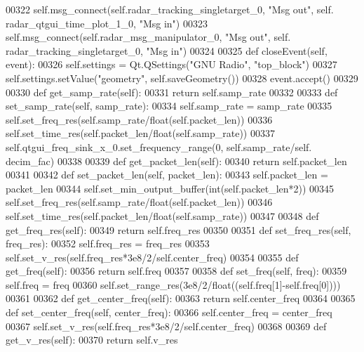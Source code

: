 \begin{DoxyCode}
00322         self.msg\_connect(self.radar_tracking_singletarget_0, \textcolor{stringliteral}{"Msg out"}, self.
      radar_qtgui_time_plot_1_0, \textcolor{stringliteral}{"Msg in"})
00323         self.msg\_connect(self.radar_msg_manipulator_0, \textcolor{stringliteral}{"Msg out"}, self.
      radar_tracking_singletarget_0, \textcolor{stringliteral}{"Msg in"})
00324 
00325     \textcolor{keyword}{def }closeEvent(self, event):
00326         self.settings = Qt.QSettings(\textcolor{stringliteral}{"GNU Radio"}, \textcolor{stringliteral}{"top\_block"})
00327         self.settings.setValue(\textcolor{stringliteral}{"geometry"}, self.saveGeometry())
00328         event.accept()
00329 
00330     \textcolor{keyword}{def }get_samp_rate(self):
00331         \textcolor{keywordflow}{return} self.samp_rate
00332 
00333     \textcolor{keyword}{def }set_samp_rate(self, samp\_rate):
00334         self.samp_rate = samp\_rate
00335         self.set_freq_res(self.samp_rate/float(self.packet_len))
00336         self.set_time_res(self.packet_len/float(self.samp_rate))
00337         self.qtgui\_freq\_sink\_x\_0.set\_frequency\_range(0, self.samp_rate/self.
      decim_fac)
00338 
00339     \textcolor{keyword}{def }get_packet_len(self):
00340         \textcolor{keywordflow}{return} self.packet_len
00341 
00342     \textcolor{keyword}{def }set_packet_len(self, packet\_len):
00343         self.packet_len = packet\_len
00344         self.set_min_output_buffer(int(self.packet_len*2))
00345         self.set_freq_res(self.samp_rate/float(self.packet_len))
00346         self.set_time_res(self.packet_len/float(self.samp_rate))
00347 
00348     \textcolor{keyword}{def }get_freq_res(self):
00349         \textcolor{keywordflow}{return} self.freq_res
00350 
00351     \textcolor{keyword}{def }set_freq_res(self, freq\_res):
00352         self.freq_res = freq\_res
00353         self.set_v_res(self.freq_res*3e8/2/self.center_freq)
00354 
00355     \textcolor{keyword}{def }get_freq(self):
00356         \textcolor{keywordflow}{return} self.freq
00357 
00358     \textcolor{keyword}{def }set_freq(self, freq):
00359         self.freq = freq
00360         self.set_range_res(3e8/2/float((self.freq[1]-self.freq[0])))
00361 
00362     \textcolor{keyword}{def }get_center_freq(self):
00363         \textcolor{keywordflow}{return} self.center_freq
00364 
00365     \textcolor{keyword}{def }set_center_freq(self, center\_freq):
00366         self.center_freq = center\_freq
00367         self.set_v_res(self.freq_res*3e8/2/self.center_freq)
00368 
00369     \textcolor{keyword}{def }get_v_res(self):
00370         \textcolor{keywordflow}{return} self.v_res

\end{DoxyCode}
